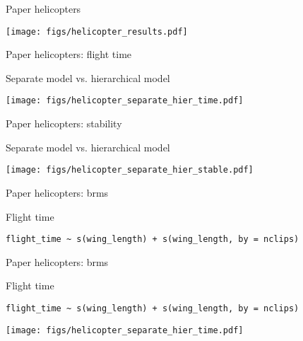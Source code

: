 \documentclass[finnish,english,t]{beamer}
\begin{document}
  

\begin{frame}{Paper helicopters}

  \texttt{[image: figs/helicopter\_results.pdf]}
  
\end{frame}

\begin{frame}{Paper helicopters: flight time}

  Separate model vs. hierarchical model
  
  \texttt{[image: figs/helicopter\_separate\_hier\_time.pdf]}
  
\end{frame}

\begin{frame}{Paper helicopters: stability}

  Separate model vs. hierarchical model
  
  \texttt{[image: figs/helicopter\_separate\_hier\_stable.pdf]}
  
\end{frame}

\begin{frame}[fragile]{Paper helicopters: brms}

  Flight time

{\small
\begin{verbatim}
flight_time ~ s(wing_length) + s(wing_length, by = nclips)
\end{verbatim}
}
  
\end{frame}

\begin{frame}[fragile]{Paper helicopters: brms}

  Flight time

{\small
\begin{verbatim}
flight_time ~ s(wing_length) + s(wing_length, by = nclips)
\end{verbatim}
}

  \texttt{[image: figs/helicopter\_separate\_hier\_time.pdf]}

\end{frame}
\end{document}
